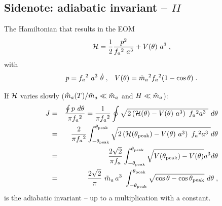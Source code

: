\documentclass[10pt,utf8,compress,xcolor=dvipsnames]{beamer}
\begin{document}
\subsection{Sidenote: adiabatic invariant -- $II$}
\begin{frame}{\insertsubsectionhead}
	The Hamiltonian that results in the EOM
	\begin{equation*}
	\mathcal{H} = \dfrac{1}{2} \dfrac{p^2}{f_{a}{}^2 \ a^3} + V(\theta) \ a^3\;,
	\end{equation*}
	with 
	\begin{eqnarray*}
		& p = \fa^2 \ a^3 \ \dot \theta\;, \hfill
		& V(\theta) = \maT^2 \fa^2 (1-\cos \theta) \;.
	\end{eqnarray*}
	
	If $\mathcal{H}$ varies slowly ($\dot {\tilde{m}}_{a}(T)/\tilde m_{a}{} \ll \tilde m_{a}{}$ and $H \ll \tilde m_{a}{}$):
	\begin{eqnarray*}
		J &=& \dfrac{\oint p \ d \theta}{\pi f_{a}{}^2} = \dfrac{1}{\pi f_{a}{}^2} \oint \sqrt{ 2\left(  \mathcal{H}(\theta) - V(\theta) \ a^3 \right) \ f_{a}{}^2 a^3 \ }  \ d \theta  \\ &=&
		\dfrac{2}{\pi f_{a}{}^2} \int_{-\theta_{\rm peak}{}}^{\theta_{\rm peak}{}} \sqrt{ 2\left(  \mathcal{H}(\theta_{\rm peak}{}) - V(\theta) \ a^3 \right) \ f_{a}{}^2 a^3 \ } d \theta \\ &=&
		\dfrac{2 \sqrt{2} }{\pi f_{a}{}}  \int_{- \theta_{\rm peak}{}} ^{\theta_{\rm peak}{}}  \sqrt{ V(\theta_{\rm peak}{}) - V(\theta) } a^{3} d \theta \\ &=& 
		\dfrac{2 \sqrt{2} }{\pi} \ \tilde m_{a}{} \, a^3 \ \displaystyle \int_{- \theta_{\rm peak}{}}^{\theta_{\rm peak}{}} \sqrt{\cos \theta - \cos \theta_{\rm peak}{}} \ d \theta  \;,
	\end{eqnarray*}
	is the adiabatic invariant -- up to a multiplication with a constant.
\end{frame}
\end{document}
